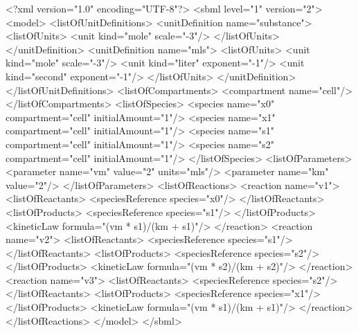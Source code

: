 \documentclass[10pt]{cekarticle}
\newcommand{\changed}[1]{\textcolor{BrickRed}{#1}}
\begin{document}
\begin{example}
<?xml version="1.0" encoding="UTF-8"?>
<sbml level="1" version="\changed{2}">
    <model>
        <listOfUnitDefinitions>
            <unitDefinition name="substance">
                <listOfUnits>
                    <unit kind="mole" scale="-3"/>
                </listOfUnits>
            </unitDefinition>
            <unitDefinition name="mls">
                <listOfUnits>
                    <unit kind="mole"   scale="-3"/>
                    <unit kind="liter"  exponent="-1"/>
                    <unit kind="second" exponent="-1"/>
                </listOfUnits>
            </unitDefinition>
        </listOfUnitDefinitions>
        <listOfCompartments>
            <compartment name="cell"/>
        </listOfCompartments>
        <listOfSpecies>
            <\changed{species} name="x0" compartment="cell" initialAmount="1"/>
            <\changed{species} name="x1" compartment="cell" initialAmount="1"/>
            <\changed{species} name="s1" compartment="cell" initialAmount="1"/>
            <\changed{species} name="s2" compartment="cell" initialAmount="1"/>
        </listOfSpecies>
        <listOfParameters>
            <parameter name="vm" value="2" units="mls"/>
            <parameter name="km" value="2"/>
        </listOfParameters>
        <listOfReactions>
            <reaction name="v1">
                <listOfReactants>
                    <\changed{speciesReference} \changed{species=}"x0"/>
                </listOfReactants>
                <listOfProducts>
                    <\changed{speciesReference} \changed{species=}"s1"/>
                </listOfProducts>
                <kineticLaw formula="(vm * s1)/(km + s1)"/>
            </reaction>
            <reaction name="v2">
                <listOfReactants>
                    <\changed{speciesReference} \changed{species=}"s1"/>
                </listOfReactants>
                <listOfProducts>
                    <\changed{speciesReference} \changed{species=}"s2"/>
                </listOfProducts>
                <kineticLaw formula="(vm * s2)/(km + s2)"/>
            </reaction>
            <reaction name="v3">
                <listOfReactants>
                    <\changed{speciesReference} \changed{species=}"s2"/>
                </listOfReactants>
                <listOfProducts>
                    <\changed{speciesReference} \changed{species=}"x1"/>
                </listOfProducts>
                <kineticLaw formula="(vm * s1)/(km + s1)"/>
            </reaction>
        </listOfReactions>
    </model>
</sbml>
\end{example}
\end{document}
